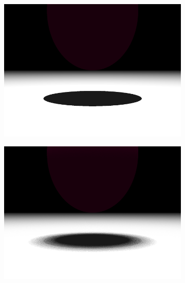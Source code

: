\documentclass{article}
\begin{document}
\begin{figure}[hb]
  \begin{subfigure}{0.45\textwidth}
    \includegraphics[width=1\textwidth]{images/samples0.png}
  \end{subfigure}
  \begin{subfigure}{0.45\textwidth}
    \includegraphics[width=1\textwidth]{images/samples10.png}
  \end{subfigure}


\end{figure}
\end{document}
